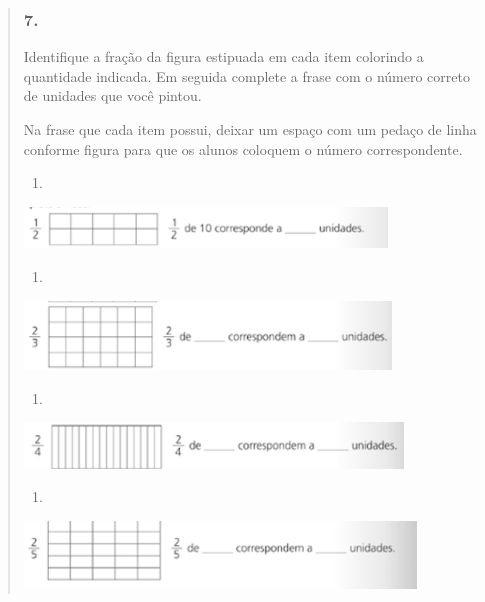 \begin{enumerate}
\begin{escolha}
\begin{enumerate}
\begin{itemize}
\begin{itemize}
\begin{escolha}
\begin{quote}
\begin{escolha}
{\subsubsection{7. }\label{section-110}

Identifique a fração da figura estipuada em cada item colorindo a
quantidade indicada. Em seguida complete a frase com o número correto de
unidades que você pintou.

Na frase que cada item possui, deixar um espaço com um pedaço de linha
conforme figura para que os alunos coloquem o número correspondente.

\begin{enumerate}
\def\labelenumi{\alph{enumi})}
\item
\end{enumerate}

\includegraphics[width=3.79199in,height=0.43337in]{media/image114.png}

\begin{enumerate}
\def\labelenumi{\alph{enumi})}
\item
\end{enumerate}

\includegraphics[width=3.83367in,height=0.72506in]{media/image115.png}

\begin{enumerate}
\def\labelenumi{\alph{enumi})}
\item
\end{enumerate}

\includegraphics[width=3.95868in,height=0.48337in]{media/image116.png}

\begin{enumerate}
\def\labelenumi{\alph{enumi})}
\item
\end{enumerate}

\includegraphics[width=4.09202in,height=0.70839in]{media/image117.png}

}
\end{escolha}
\end{quote}
\end{escolha}
\end{itemize}
\end{itemize}
\end{enumerate}
\end{escolha}
\end{enumerate}
